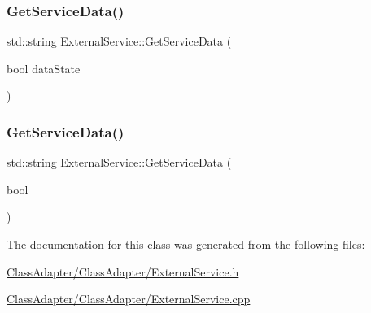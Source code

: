 \subsubsection{\texorpdfstring{GetServiceData()}{GetServiceData()}\hspace{0.1cm}{\footnotesize\ttfamily [1/2]}}
{\footnotesize\ttfamily std\+::string External\+Service\+::\+Get\+Service\+Data (\begin{DoxyParamCaption}\item[{bool}]{data\+State }\end{DoxyParamCaption})}

\mbox{\label{class_external_service_acf6df99a7f8f5cc56cc7d923224ca0c3}} 
\subsubsection{\texorpdfstring{GetServiceData()}{GetServiceData()}\hspace{0.1cm}{\footnotesize\ttfamily [2/2]}}
{\footnotesize\ttfamily std\+::string External\+Service\+::\+Get\+Service\+Data (\begin{DoxyParamCaption}\item[{bool}]{ }\end{DoxyParamCaption})}



The documentation for this class was generated from the following files\+:\begin{DoxyCompactItemize}
\item 
\mbox{\hyperlink{_class_adapter_2_class_adapter_2_external_service_8h}{Class\+Adapter/\+Class\+Adapter/\+External\+Service.\+h}}\item 
\mbox{\hyperlink{_class_adapter_2_class_adapter_2_external_service_8cpp}{Class\+Adapter/\+Class\+Adapter/\+External\+Service.\+cpp}}\end{DoxyCompactItemize}
